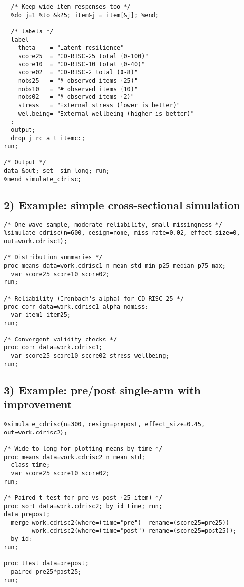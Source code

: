 \documentclass[12pt]{article}
\begin{document}
\begin{lstlisting}
  /* Keep wide item responses too */
  %do j=1 %to &k25; item&j = item[&j]; %end;

  /* labels */
  label
    theta    = "Latent resilience"
    score25  = "CD-RISC-25 total (0-100)"
    score10  = "CD-RISC-10 total (0-40)"
    score02  = "CD-RISC-2 total (0-8)"
    nobs25   = "# observed items (25)"
    nobs10   = "# observed items (10)"
    nobs02   = "# observed items (2)"
    stress   = "External stress (lower is better)"
    wellbeing= "External wellbeing (higher is better)"
  ;
  output;
  drop j rc a t itemc:;
run;

/* Output */
data &out; set _sim_long; run;
%mend simulate_cdrisc;
\end{lstlisting}

\subsection*{2) Example: simple cross-sectional simulation}
\begin{lstlisting}
/* One-wave sample, moderate reliability, small missingness */
%simulate_cdrisc(n=600, design=none, miss_rate=0.02, effect_size=0, out=work.cdrisc1);

/* Distribution summaries */
proc means data=work.cdrisc1 n mean std min p25 median p75 max;
  var score25 score10 score02;
run;

/* Reliability (Cronbach's alpha) for CD-RISC-25 */
proc corr data=work.cdrisc1 alpha nomiss;
  var item1-item25;
run;

/* Convergent validity checks */
proc corr data=work.cdrisc1;
  var score25 score10 score02 stress wellbeing;
run;
\end{lstlisting}

\subsection*{3) Example: pre/post single-arm with improvement}
\begin{lstlisting}
%simulate_cdrisc(n=300, design=prepost, effect_size=0.45, out=work.cdrisc2);

/* Wide-to-long for plotting means by time */
proc means data=work.cdrisc2 n mean std;
  class time;
  var score25 score10 score02;
run;

/* Paired t-test for pre vs post (25-item) */
proc sort data=work.cdrisc2; by id time; run;
data prepost;
  merge work.cdrisc2(where=(time="pre")  rename=(score25=pre25))
        work.cdrisc2(where=(time="post") rename=(score25=post25));
  by id;
run;

proc ttest data=prepost;
  paired pre25*post25;
run;
\end{lstlisting}
\end{document}
